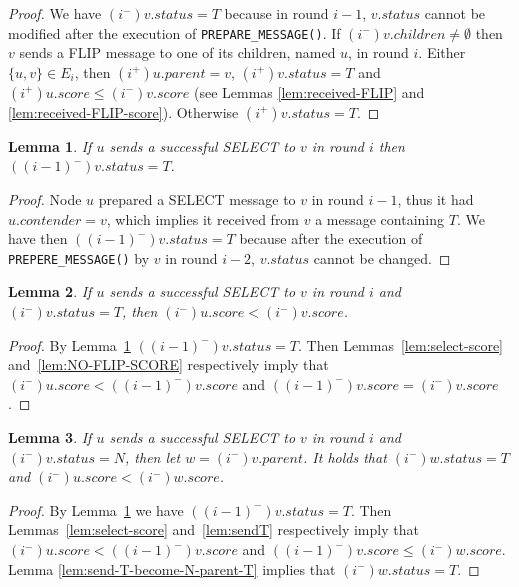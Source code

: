 \documentclass[twocolumn]{article}
\newtheorem{lemma}{Lemma}
\newcommand{\depends}[1]{}
\newcommand{\state}[3]{\ensuremath{(#2^{#3})#1}}
\newcommand{\uim}{\state{u}{i}{-}}
\newcommand{\vim}{\state{v}{i}{-}}
\newcommand{\wim}{\state{w}{i}{-}}
\newcommand{\uip}{\state{u}{i}{+}}
\newcommand{\vip}{\state{v}{i}{+}}
\newcommand{\vimm}{\state{v}{(i-1)}{-}}
\begin{document}
\begin{proof}
  We have $\vim.status=T$ because in round $i-1$, $v.status$ cannot be modified after the execution of \texttt{PREPARE\_MESSAGE()}. 
If $\vim.children \neq \emptyset$ 
then $v$ sends a FLIP message to one of its children, named $u$, in round $i$.
Either $\{u,v\}\in E_i$, then $\uip.parent=v$, $\vip.status = T$ and
$\uip.score \leq \vim.score$ 
(see Lemmas \ref{lem:received-FLIP} and \ref{lem:received-FLIP-score}).
Otherwise $\vip.status=T$.
 \end{proof}


\begin{lemma}
 \label{lem:selected-was-T}
If $u$ sends a successful SELECT to $v$ in round $i$ then $\vimm.status= T$.
\depends{\ref{lem:T-if-T}}
\end{lemma}
\begin{proof}
    Node $u$ prepared a SELECT message to $v$ in round $i-1$,
    thus it had $u.contender=v$, which implies it received from $v$ 
    a message containing $T$. We have then $\vimm.status= T$ because after the execution of \texttt{PREPERE\_MESSAGE()} by $v$ in round $i-2$, $v.status$ cannot be changed. 
 \end{proof}


\begin{lemma}
 \label{lem:selected-T}
If $u$ sends a successful SELECT to $v$ in round $i$ and $\vim.status= T$, then $\uim.score < \vim.score$.
\depends{\ref{lem:select-score}, \ref{lem:T-T-keep-score}, \ref{lem:selected-was-T}}
\end{lemma}

\begin{proof}
    By Lemma~\ref{lem:selected-was-T} $\vimm.status=T$. Then Lemmas~\ref{lem:select-score} and~\ref{lem:NO-FLIP-SCORE} respectively imply that $\uim.score < \vimm.score$ and $\vimm.score = \vim.score$.
 \end{proof}


\begin{lemma}
 \label{lem:selected-N}
If $u$ sends a successful SELECT to $v$ in round $i$ and  
$\vim.status= N$, then let $w=\vim.parent$. 
It holds that $\wim.status= T$ 
and $\uim.score < \wim.score$.
\depends{\ref{lem:select-score}, \ref{lem:sendT}, \ref{lem:selected-was-T}, \ref{lem:send-T-become-N-parent-T}}
\end{lemma}
\begin{proof}
    By Lemma~\ref{lem:selected-was-T} we have $\vimm.status=T$. 
    Then Lemmas~\ref{lem:select-score} and~\ref{lem:sendT} respectively imply that $\uim.score < \vimm.score$ and $\vimm.score \leq \wim.score$.  
Lemma \ref {lem:send-T-become-N-parent-T}  implies that $\wim.status= T$.
 \end{proof}
\end{document}
